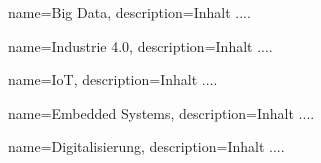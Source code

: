 \makeglossaries

{
	name=Big Data,
	description={Inhalt ....}
}


{
	name=Industrie 4.0,
	description={Inhalt ....}
}


{
	name=IoT,
	description={Inhalt ....}
}


{
	name=Embedded Systems,
	description={Inhalt ....}
}


{
	name=Digitalisierung,
	description={Inhalt ....}
}



